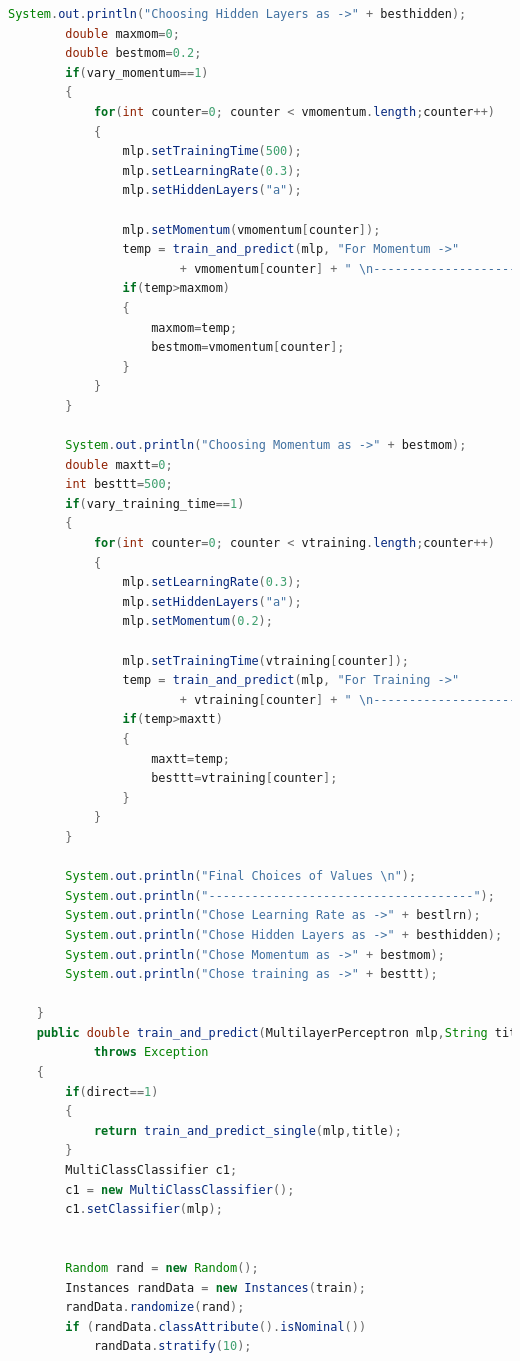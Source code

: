 \documentclass[fontsize=10pt,DIV=14]{scrartcl}
\begin{document}
\begin{itemize}
\begin{lstlisting}[language=Java,frame=single]
        System.out.println("Choosing Hidden Layers as ->" + besthidden);
        double maxmom=0;
        double bestmom=0.2;
        if(vary_momentum==1)
        {
            for(int counter=0; counter < vmomentum.length;counter++)
            {
                mlp.setTrainingTime(500);
                mlp.setLearningRate(0.3);
                mlp.setHiddenLayers("a");
                
                mlp.setMomentum(vmomentum[counter]);
                temp = train_and_predict(mlp, "For Momentum ->" 
                        + vmomentum[counter] + " \n---------------------------");
                if(temp>maxmom)
                {
                    maxmom=temp;
                    bestmom=vmomentum[counter];
                }
            }
        }
        
        System.out.println("Choosing Momentum as ->" + bestmom);
        double maxtt=0;
        int besttt=500;
        if(vary_training_time==1)
        {
            for(int counter=0; counter < vtraining.length;counter++)
            {
                mlp.setLearningRate(0.3);
                mlp.setHiddenLayers("a");
                mlp.setMomentum(0.2);
                
                mlp.setTrainingTime(vtraining[counter]);
                temp = train_and_predict(mlp, "For Training ->" 
                        + vtraining[counter] + " \n---------------------------");
                if(temp>maxtt)
                {
                    maxtt=temp;
                    besttt=vtraining[counter];
                }
            }
        }
        
        System.out.println("Final Choices of Values \n");
        System.out.println("-------------------------------------");
        System.out.println("Chose Learning Rate as ->" + bestlrn);
        System.out.println("Chose Hidden Layers as ->" + besthidden);
        System.out.println("Chose Momentum as ->" + bestmom);
        System.out.println("Chose training as ->" + besttt);
        
    }
    public double train_and_predict(MultilayerPerceptron mlp,String title)
            throws Exception
    {
        if(direct==1)
        {
            return train_and_predict_single(mlp,title);
        }
        MultiClassClassifier c1;
        c1 = new MultiClassClassifier();
        c1.setClassifier(mlp);
        
        
        Random rand = new Random();
        Instances randData = new Instances(train);
        randData.randomize(rand);
        if (randData.classAttribute().isNominal())
            randData.stratify(10);
        

\end{lstlisting}
\end{itemize}
\end{document}
